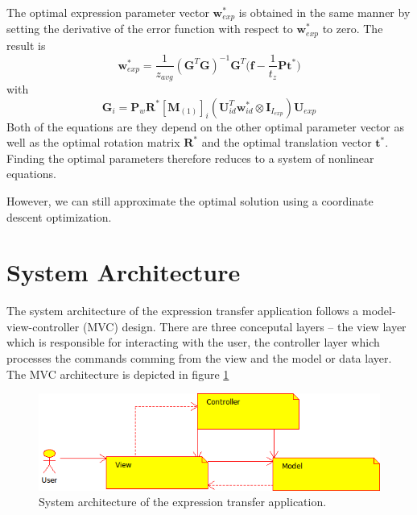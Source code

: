 \documentclass[11pt,a4paper]{report}
\begin{document}
The optimal expression parameter vector $\mathbf{w}^*_{exp}$ is obtained in the
same manner by setting the derivative of the error function with respect to
$\mathbf{w}^*_{exp}$ to zero. The result is 
\begin{equation}
\mathbf{w}^*_{exp} = \frac{1}{z_{avg}}(\mathbf{G}^T\mathbf{G})^{-1}\mathbf{G}^T\bigl(\mathbf{f} - \frac{1}{t_z}\mathbf{P}\mathbf{t}^*\bigr)
\end{equation}
with 
\begin{equation*}
\mathbf{G}_i =
\mathbf{P}_w\mathbf{R}^*[\mathbf{M}_{(1)}]_{i}(\mathbf{U}_{id}^T\mathbf{w}^*_{id}
\otimes \mathbf{I}_{I_{exp}})\mathbf{U}_{exp}
\end{equation*}
Both of the equations are they depend on the other optimal parameter vector as
well as the optimal rotation matrix $\mathbf{R}^*$ and the optimal translation
vector $\mathbf{t}^*$. Finding the optimal parameters therefore reduces to a
system of nonlinear equations. 

However, we can still approximate the optimal solution using a coordinate
descent optimization.
\section{System Architecture}
The system architecture of the expression transfer application follows a
model-view-controller (MVC) design. There are three conceputal layers -- the
view layer which is responsible for interacting with the user, the controller
layer which processes the commands comming from the view and the model or data
layer. The MVC architecture is depicted in figure \ref{fg:mvc} 

\begin{figure}[H]
\begin{centering}
\includegraphics[scale=0.75]{images/mvc.png}
\par\end{centering}

\caption{System architecture of the expression transfer application.}
\label{fg:mvc}
\end{figure}
\end{document}
